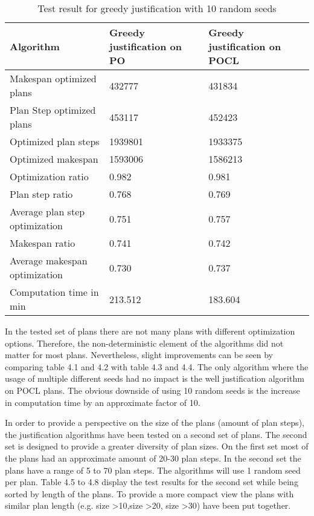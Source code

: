 \begin{table}[]
    \begin{tabular}{lll}
        \hline
        Algorithm                 & Greedy justification on PO & Greedy justification on POCL \\ \hline
        Makespan optimized plans  & 432777                     & 431834                       \\
        Plan Step optimized plans & 453117                     & 452423                       \\
        Optimized plan steps      & 1939801                    & 1933375                      \\
        Optimized makespan        & 1593006                    & 1586213                      \\
        Optimization ratio        & 0.982                      & 0.981                        \\
        Plan step ratio           & 0.768                      & 0.769                        \\
        Average plan step optimization &0.751                  & 0.757                          \\
        Makespan ratio            & 0.741                      & 0.742                        \\
        Average makespan optimization &0.730                   & 0.737                             \\
        Computation time in min   & 213.512                    & 183.604                     
    \end{tabular}
    \caption{Test result for greedy justification with 10 random seeds}
\end{table}

In the tested set of plans there are not many plans with different optimization options. Therefore, 
the non-deterministic element of the algorithms did not matter for most plans.
Nevertheless, slight improvements can be seen by comparing table 4.1 and 4.2 with table 4.3 and 4.4.
The only algorithm where the usage of multiple different seeds had no impact is the 
well justification algorithm on POCL plans.
The obvious downside of using 10 random seeds is the increase in computation time by an approximate factor of 10. 


In order to provide a perspective on the size of the plans (amount of plan steps),
the justification algorithms have been tested on a second set of plans.
The second set is designed to provide a greater diversity of plan sizes. 
On the first set most of the plans had an approximate amount of 20-30 plan steps.
In the second set the plans have a range of 5 to 70 plan steps.
The algorithms will use 1 random seed per plan. 
Table 4.5 to 4.8 display the test results for the second set while 
being sorted by length of the plans. 
To provide a more compact view the plans with similar plan length (e.g. size \textgreater{}10,size \textgreater{}20, size \textgreater{}30) have been 
put together.


